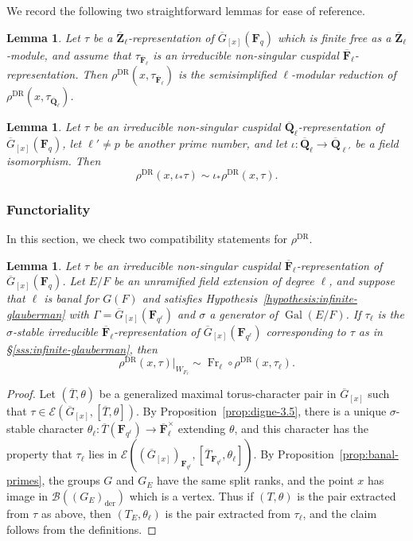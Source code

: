 \documentclass[reqno]{amsart}
\numberwithin{equation}{subsection}
\newcommand{\F}{\mathbf{F}}
\newcommand{\Q}{\mathbf{Q}}
\newcommand{\Z}{\mathbf{Z}}
\newcommand{\Gal}{\operatorname{Gal}}
\newcommand{\ol}[1]{\overline{#1}}
\newcommand{\co}{\colon}
\newcommand\cB{\mathcal{B}}
\newcommand\cE{\mathcal{E}}
\DeclareMathOperator{\der}{der}
\DeclareMathOperator{\DR}{DR}
\DeclareMathOperator{\Fr}{Fr}
\newtheorem{lemma}[thm]{Lemma}
\theoremstyle{remark}
\numberwithin{equation}{subsection}
\numberwithin{figure}{subsection}
\begin{document}
We record the following two straightforward lemmas for ease of reference.

\begin{lemma}\label{lemma:depth-0-modular-reduction}
    Let $\tau$ be a $\ol\Z_\ell$-representation of $\ol G_{[x]}(\F_q)$ which is finite free as a $\ol\Z_\ell$-module, and assume that $\tau_{\ol\F_\ell}$ is an irreducible non-singular cuspidal $\ol\F_\ell$-representation. Then $\rho^{\DR}(x, \tau_{\ol\F_\ell})$ is the semisimplified $\ell$-modular reduction of $\rho^{\DR}(x, \tau_{\ol\Q_\ell})$.
\end{lemma}

\begin{lemma}\label{lemma:depth-0-independence-of-ell}
    Let $\tau$ be an irreducible non-singular cuspidal $\ol\Q_\ell$-representation of $\ol G_{[x]}(\F_q)$, let $\ell' \neq p$ be another prime number, and let $\iota\co \ol\Q_\ell \to \ol\Q_{\ell'}$ be a field isomorphism. Then
    \[
    \rho^{\DR}(x, \iota_*\tau) \sim \iota_*\rho^{\DR}(x, \tau).
    \]
\end{lemma}

\subsubsection{Functoriality}

In this section, we check two compatibility statements for $\rho^{\DR}$.

\begin{lemma}\label{lemma:depth-0-bc}
    Let $\tau$ be an irreducible non-singular cuspidal $\ol\F_\ell$-representation of $\ol G_{[x]}(\F_q)$. Let $E/F$ be an unramified field extension of degree $\ell$, and suppose that $\ell$ is banal for $G(F)$ and satisfies Hypothesis~\ref{hypothesis:infinite-glauberman} with $\Gamma = \ol G_{[x]}(\F_{q^\ell})$ and $\sigma$ a generator of $\Gal(E/F)$. If $\tau_\ell$ is the $\sigma$-stable irreducible $\ol\F_\ell$-representation of $\ol G_{[x]}(\F_{q^\ell})$ corresponding to $\tau$ as in \S\ref{sss:infinite-glauberman}, then
    \[
    \rho^{\DR}(x, \tau)|_{W_{F_\ell}} \sim \Fr_\ell \circ \rho^{\DR}(x, \tau_\ell).
    \]
\end{lemma}

\begin{proof}
    Let $(\ol T, \theta)$ be a generalized maximal torus-character pair in $\ol G_{[x]}$ such that $\tau \in \cE(\ol G_{[x]}, [\ol T, \theta])$. By Proposition~\ref{prop:digne-3.5}, there is a unique $\sigma$-stable character $\theta_\ell\co \ol T(\F_{q^\ell}) \to \ol\F_\ell^\times$ extending $\theta$, and this character has the property that $\tau_\ell$ lies in $\cE((\ol G_{[x]})_{\F_{q^\ell}}, [\ol T_{\F_{q^\ell}}, \theta_\ell])$. By Proposition~\ref{prop:banal-primes}, the groups $G$ and $G_E$ have the same split ranks, and the point $x$ has image in $\cB((G_E)_{\der})$ which is a vertex. Thus if $(T, \theta)$ is the pair extracted from $\tau$ as above, then $(T_E, \theta_\ell)$ is the pair extracted from $\tau_\ell$, and the claim follows from the definitions.
\end{proof}
\end{document}
